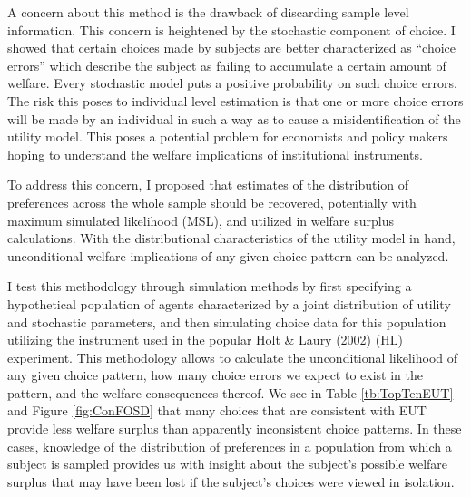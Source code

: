 \documentclass[../main.tex]{subfiles}
\begin{document}
A concern about this method is the drawback of discarding sample level information.
This concern is heightened by the stochastic component of choice.
I showed that certain choices made by subjects are better characterized as \enquote{choice errors} which describe the subject as failing to accumulate a certain amount of welfare.
Every stochastic model puts a positive probability on such choice errors.
The risk this poses to individual level estimation is that one or more choice errors will be made by an individual in such a way as to cause a misidentification of the utility model.
This poses a potential problem for economists and policy makers hoping to understand the welfare implications of institutional instruments.

To address this concern, I proposed that estimates of the distribution of preferences across the whole sample should be recovered, potentially with maximum simulated likelihood (MSL), and utilized in welfare surplus calculations.
With the distributional characteristics of the utility model in hand, unconditional welfare implications of any given choice pattern can be analyzed.

I test this methodology through simulation methods by first specifying a hypothetical population of agents characterized by a joint distribution of utility and stochastic parameters, and then simulating choice data for this population utilizing the instrument used in the popular Holt \& Laury (2002) (HL) experiment.
This methodology allows to calculate the unconditional likelihood of any given choice pattern, how many choice errors we expect to exist in the pattern, and the welfare consequences thereof.
We see in Table \ref{tb:TopTenEUT} and Figure \ref{fig:ConFOSD} that many choices that are consistent with EUT provide less welfare surplus than apparently inconsistent choice patterns.
In these cases, knowledge of the distribution of preferences in a population from which a subject is sampled provides us with insight about the subject's possible welfare surplus that may have been lost if the subject's choices were viewed in isolation.

\end{document}
